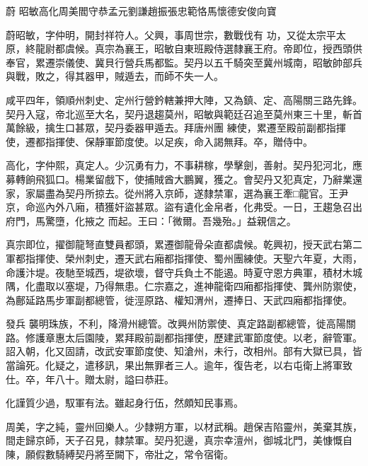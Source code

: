 
\begin{pinyinscope}

 蔚
 昭敏高化周美閻守恭孟元劉謙趙振張忠範恪馬懷德安俊向寶



 蔚昭敏，字仲明，開封祥符人。父興，事周世宗，數戰伐有
 功，又從太宗平太原，終龍尉都虞候。真宗為襄王，昭敏自東班殿侍選隸襄王府。帝即位，授西頭供奉官，累遷崇儀使、冀貝行營兵馬都監。契丹以五千騎突至冀州城南，昭敏帥部兵與戰，敗之，得其器甲，賊遁去，而師不失一人。



 咸平四年，領順州刺史、定州行營鈐轄兼押大陣，又為鎮、定、高陽關三路先鋒。契丹入寇，帝北巡至大名，契丹退趨莫州，昭敏與範廷召追至莫州東三十里，斬首萬餘級，擒生口甚眾，契丹委器甲遁去。拜唐州團
 練使，累遷至殿前副都指揮使，遷都指揮使、保靜軍節度使。以足疾，命入謁無拜。卒，贈侍中。



 高化，字仲熙，真定人。少沉勇有力，不事耕稼，學擊劍，善射。契丹犯河北，應募轉餉飛狐口。楊業留戲下，使捕賊酋大鵬翼，獲之。會契丹又犯真定，乃辭業還家，家屬盡為契丹所掠去。從州將入京師，遂隸禁軍，選為襄王牽□龍官。王尹京，命巡內外八廂，積獲奸盜甚眾。盜有遺化金帛者，化弗受。一日，王趨急召出府門，馬驚墮，化掖之
 而起。王曰：「微爾。吾幾殆。」益親信之。



 真宗即位，擢御龍弩直雙員都頭，累遷御龍骨朵直都虞候。乾興初，授天武右第二軍都指揮使、榮州刺史，遷天武右廂都指揮使、蜀州團練使。天聖六年夏，大雨，命護汴堤。夜馳至城西，堤欲壞，督守兵負土不能遏。時夏守恩方典軍，積材木城隅，化盡取以塞堤，乃得無患。仁宗嘉之，進神龍衛四廂都指揮使、龔州防禦使，為鄜延路馬步軍副都總管，徙涇原路、權知渭州，遷捧日、天武四廂都指揮使。



 發兵
 襲明珠族，不利，降滑州總管。改興州防禦使、真定路副都總管，徙高陽關路。修護章惠太后園陵，累拜殿前副都指揮使，歷建武軍節度使。以老，辭管軍。詔入朝，化又固請，改武安軍節度使、知滄州，未行，改相州。部有大獄已具，皆當論死。化疑之，遣移訊，果出無罪者三人。逾年，復告老，以右屯衛上將軍致仕。卒，年八十。贈太尉，謚曰恭莊。



 化謹質少過，馭軍有法。雖起身行伍，然頗知民事焉。



 周美，字之純，靈州回樂人。少隸朔方軍，以材武稱。趙保吉陷靈州，美棄其族，間走歸京師，天子召見，隸禁軍。契丹犯邊，真宗幸澶州，御城北門，美慷慨自陳，願假數騎縛契丹將至闕下，帝壯之，常令宿衛。




\end{pinyinscope}

